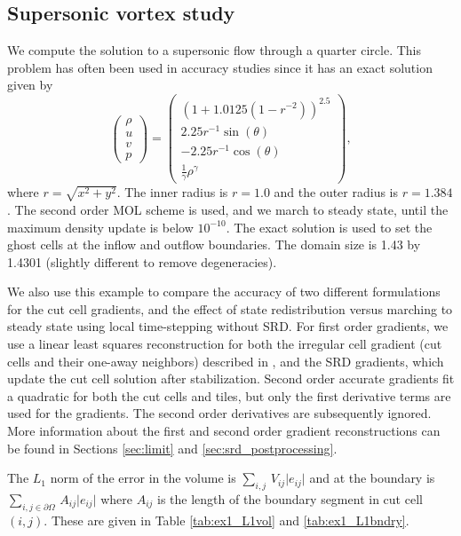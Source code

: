 \subsection{Supersonic vortex study}
We compute the solution to a supersonic flow 
through a quarter circle.  This problem has often been used in accuracy 
studies \cite{aftosmis:acc} since it has an exact solution given by 
$$
\begin{pmatrix}
\rho\\
u \\
v \\
p
\end{pmatrix} = 
\begin{pmatrix}
\left ( 1 + 1.0125(1-r^{-2}) \right)^{2.5}\\
2.25r^{-1}\sin(\theta)\\
-2.25r^{-1}\cos(\theta)\\
\frac{1}{\gamma}\rho^{\gamma}
\end{pmatrix},
$$
where $r = \sqrt{x^2+y^2}$. The inner radius is $r = 1.0$ and the outer radius
is $r = 1.384$. The second order MOL scheme is used, and we march
to steady state, until the maximum density update is below $10^{-10}$.  
The exact solution is used to set the ghost cells at the inflow and
outflow boundaries. The domain size is 1.43 by 1.4301 (slightly different
to remove degeneracies).  

We also use this example to compare the accuracy of two different formulations
for the cut cell gradients, and the effect of state redistribution versus 
marching to steady state using local time-stepping without SRD.  
For first order gradients, we use a linear least squares reconstruction for
both the irregular cell gradient (cut cells and their one-away neighbors) described in , and the SRD gradients, which update the cut cell solution after stabilization. Second order accurate gradients fit a quadratic for both
the cut cells and tiles, but only the first derivative terms are used for 
the gradients. The second order derivatives are subsequently ignored.  More information about the first and second order gradient reconstructions can be found in Sections \ref{sec:limit} and \ref{sec:srd_postprocessing}.

The $L_1$ norm of the error in the volume is $\sum_{i,j} \,
V_{ij} \lvert e_{ij } \rvert$ and at the boundary is $ \sum_{{i,j} \in \partial \Omega} \, A_{ij} \lvert e_{ij
} \rvert$ where $A_{ij}$ is the length of the boundary segment in cut cell $(i,j)$.
These are given in Table \ref{tab:ex1_L1vol} and \ref{tab:ex1_L1bndry}. 

